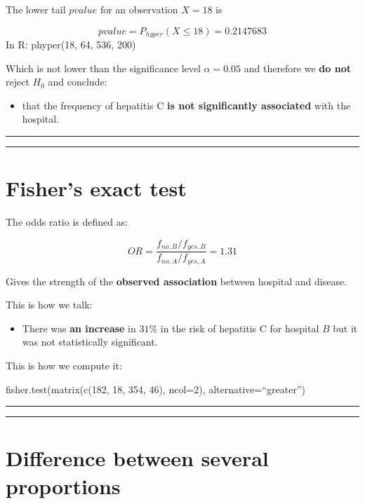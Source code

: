 \documentclass[
]{book}
\providecommand{\tightlist}{%
  \setlength{\itemsep}{0pt}\setlength{\parskip}{0pt}}
\begin{document}
The lower tail \(pvalue\) for an observation \(X=18\) is

\[pvalue=P_{hyper}(X \leq 18) =0.2147683\]
In R: phyper(18, 64, 536, 200)

Which is not lower than the significance level \(\alpha=0.05\) and therefore we \textbf{do not} reject \(H_0\) and conclude:

\begin{itemize}
\tightlist
\item
  that the frequency of hepatitis C \textbf{is not significantly associated} with the hospital.
\end{itemize}

\begin{center}\rule{0.5\linewidth}{0.5pt}\end{center}

\begin{center}\rule{0.5\linewidth}{0.5pt}\end{center}

\hypertarget{fishers-exact-test-3}{%
\section{Fisher's exact test}\label{fishers-exact-test-3}}

The odds ratio is defined as:

\[OR=\frac{f_{no,B}/f_{yes,B}}{f_{no,A}/f_{yes,A}}=1.31\]

Gives the strength of the \textbf{observed association} between hospital and disease.

This is how we talk:

\begin{itemize}
\tightlist
\item
  There was \textbf{an increase} in \(31\%\) in the risk of hepatitis C for hospital \(B\) but it was not statistically significant.
\end{itemize}

This is how we compute it:

fisher.test(matrix(c(182, 18, 354, 46), ncol=2), alternative=``greater'')

\begin{center}\rule{0.5\linewidth}{0.5pt}\end{center}

\begin{center}\rule{0.5\linewidth}{0.5pt}\end{center}

\hypertarget{difference-between-several-proportions}{%
\section{Difference between several proportions}\label{difference-between-several-proportions}}
\end{document}
